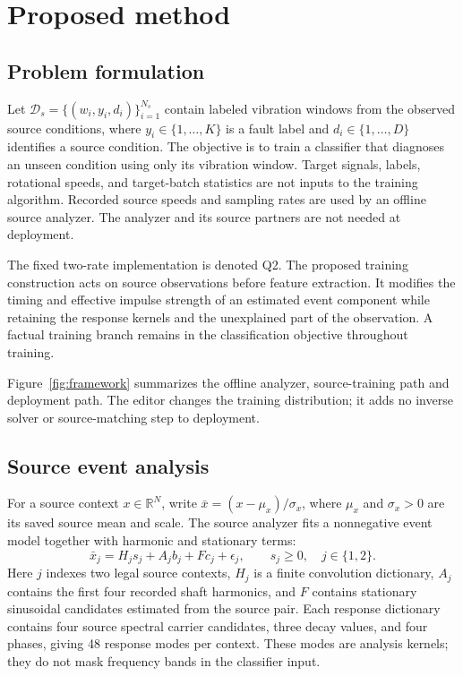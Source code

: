 \section{Proposed method}
\label{sec:method}
\subsection{Problem formulation}
Let $\mathcal D_s=\{(w_i,y_i,d_i)\}_{i=1}^{N_s}$ contain labeled vibration
windows from the observed source conditions, where $y_i\in\{1,\ldots,K\}$
is a fault label and $d_i\in\{1,\ldots,D\}$ identifies a source condition.
The objective is to train a classifier that diagnoses an unseen condition
using only its vibration window. Target signals, labels, rotational speeds,
and target-batch statistics are not inputs to the training algorithm.
Recorded source speeds and sampling rates are used by an offline source
analyzer. The analyzer and its source partners are not needed at deployment.

The fixed two-rate implementation is denoted Q2.
The proposed training construction acts on source observations before
feature extraction. It modifies the timing and effective impulse strength
of an estimated event component while retaining the response kernels and the
unexplained part of the observation. A factual training branch remains in
the classification objective throughout training.

Figure~\ref{fig:framework} summarizes the offline analyzer, source-training
path and deployment path. The editor changes the training distribution;
it adds no inverse solver or source-matching step to deployment.


\subsection{Source event analysis}
For a source context $x\in\mathbb R^N$, write
$\bar x=(x-\mu_x)/\sigma_x$, where $\mu_x$ and $\sigma_x>0$ are its saved
source mean and scale. The source analyzer fits a nonnegative event model
together with harmonic and stationary terms:
\begin{equation}
 \bar x_j=H_js_j+A_jb_j+Fc_j+\epsilon_j,\qquad s_j\geq0,
 \quad j\in\{1,2\}.
 \label{eq:analysis}
\end{equation}
Here $j$ indexes two legal source contexts, $H_j$ is a finite convolution
dictionary, $A_j$ contains the first four recorded shaft harmonics, and $F$
contains stationary sinusoidal candidates estimated from the source pair.
Each response dictionary contains four source spectral carrier candidates,
three decay values, and four phases, giving 48 response modes per context.
These modes are analysis kernels; they do not mask frequency bands in the
classifier input.

